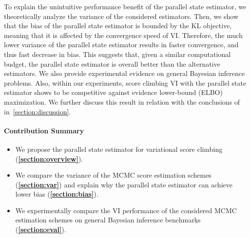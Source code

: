 To explain the unintuitive performance benefit of the parallel state estimator, we theoretically analyze the variance of the considered estimators.
Then, we show that the bias of the parallel state estimator is bounded by the KL objective, meaning that it is affected by the convergence speed of VI.
Therefore, the much lower variance of the parallel state estimator results in faster convergence, and thus fast decrease in bias.
This suggests that, given a similar computational budget, the parallel state estimator is overall better than the alternative estimators.
We also provide experimental evidence on general Bayesian inference problems.
Also, within our experiments, score climbing VI with the parallel state estimator shows to be competitive against evidence lower-bound  (ELBO) maximization.
We further discuss this result in relation with the conclusions of~\citet{dhaka_challenges_2021} in~\cref{section:discussion}.



\vspace{-0.05in}
\paragraph{Contribution Summary}
\vspace{-0.1in}
\begin{itemize}[noitemsep]
\item[\ding{228}] We propose the parallel state estimator for variational score climbing (\textbf{\cref{section:overview}}).
\item[\ding{228}] We compare the variance of the MCMC score estimation schemes (\textbf{\cref{section:var}}) and explain why the parallel state estimator can achieve lower bias (\textbf{\cref{section:bias}}).
\item[\ding{228}] We experimentally compare the VI performance of the considered MCMC estimation schemes on general Bayesian inference benchmarks (\textbf{\cref{section:eval}}).
\end{itemize}
\vspace{-0.05in}


